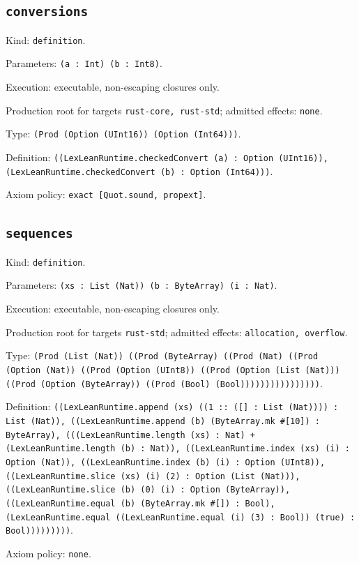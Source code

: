 \documentclass[11pt]{article}
\begin{document}
\subsection*{\texttt{conversions}}
\noindent Kind: \texttt{definition}.\par
\noindent Parameters: \texttt{(a : Int) (b : Int8)}.\par
\noindent Execution: executable, non-escaping closures only.\par
\noindent Production root for targets \texttt{rust-core, rust-std}; admitted effects: \texttt{none}.\par
\noindent Type: \texttt{(Prod (Option (UInt16)) (Option (Int64)))}.\par
\noindent Definition: \texttt{((LexLeanRuntime.checkedConvert (a) : Option (UInt16)), (LexLeanRuntime.checkedConvert (b) : Option (Int64)))}.\par
\noindent Axiom policy: \texttt{exact [Quot.sound, propext]}.\par
\subsection*{\texttt{sequences}}
\noindent Kind: \texttt{definition}.\par
\noindent Parameters: \texttt{(xs : List (Nat)) (b : ByteArray) (i : Nat)}.\par
\noindent Execution: executable, non-escaping closures only.\par
\noindent Production root for targets \texttt{rust-std}; admitted effects: \texttt{allocation, overflow}.\par
\noindent Type: \texttt{(Prod (List (Nat)) ((Prod (ByteArray) ((Prod (Nat) ((Prod (Option (Nat)) ((Prod (Option (UInt8)) ((Prod (Option (List (Nat))) ((Prod (Option (ByteArray)) ((Prod (Bool) (Bool))))))))))))))))}.\par
\noindent Definition: \texttt{((LexLeanRuntime.append (xs) ((1 :: ([] : List (Nat)))) : List (Nat)), ((LexLeanRuntime.append (b) (ByteArray.mk \#[10]) : ByteArray), (((LexLeanRuntime.length (xs) : Nat) + (LexLeanRuntime.length (b) : Nat)), ((LexLeanRuntime.index (xs) (i) : Option (Nat)), ((LexLeanRuntime.index (b) (i) : Option (UInt8)), ((LexLeanRuntime.slice (xs) (i) (2) : Option (List (Nat))), ((LexLeanRuntime.slice (b) (0) (i) : Option (ByteArray)), ((LexLeanRuntime.equal (b) (ByteArray.mk \#[]) : Bool), (LexLeanRuntime.equal ((LexLeanRuntime.equal (i) (3) : Bool)) (true) : Bool)))))))))}.\par
\noindent Axiom policy: \texttt{none}.\par
\end{document}
